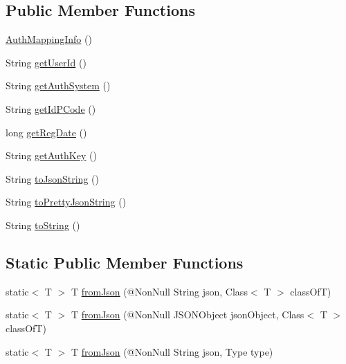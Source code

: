 \subsection*{Public Member Functions}
\begin{DoxyCompactItemize}
\item 
\hyperlink{classcom_1_1toast_1_1android_1_1gamebase_1_1auth_1_1data_1_1_auth_mapping_info_a20f85429edbd833662e307a1f067c519}{Auth\+Mapping\+Info} ()
\item 
String \hyperlink{classcom_1_1toast_1_1android_1_1gamebase_1_1auth_1_1data_1_1_auth_mapping_info_a1a86b0102452494152fce9535952e4f4}{get\+User\+Id} ()
\item 
String \hyperlink{classcom_1_1toast_1_1android_1_1gamebase_1_1auth_1_1data_1_1_auth_mapping_info_af87585b56b9b199257abe7dc8cd9f8a5}{get\+Auth\+System} ()
\item 
String \hyperlink{classcom_1_1toast_1_1android_1_1gamebase_1_1auth_1_1data_1_1_auth_mapping_info_a395665057f556d75356579ff853fbc0e}{get\+Id\+P\+Code} ()
\item 
long \hyperlink{classcom_1_1toast_1_1android_1_1gamebase_1_1auth_1_1data_1_1_auth_mapping_info_a9532e1636d0dfc2bee56231288f3eb43}{get\+Reg\+Date} ()
\item 
String \hyperlink{classcom_1_1toast_1_1android_1_1gamebase_1_1auth_1_1data_1_1_auth_mapping_info_a28802b35bac567661371ca782598bf82}{get\+Auth\+Key} ()
\item 
String \hyperlink{classcom_1_1toast_1_1android_1_1gamebase_1_1base_1_1_value_object_a58acf6402880e9769d79d8667581fa6a}{to\+Json\+String} ()
\item 
String \hyperlink{classcom_1_1toast_1_1android_1_1gamebase_1_1base_1_1_value_object_a054431f3d988a22295cfc8b784ff2637}{to\+Pretty\+Json\+String} ()
\item 
String \hyperlink{classcom_1_1toast_1_1android_1_1gamebase_1_1base_1_1_value_object_ad146fa8579a5f8a876c4688cc5a68520}{to\+String} ()
\end{DoxyCompactItemize}
\subsection*{Static Public Member Functions}
\begin{DoxyCompactItemize}
\item 
static$<$ T $>$ T \hyperlink{classcom_1_1toast_1_1android_1_1gamebase_1_1base_1_1_value_object_ae6655c88c20a9a8406dc11b46250ac7b}{from\+Json} (@Non\+Null String json, Class$<$ T $>$ class\+OfT)
\item 
static$<$ T $>$ T \hyperlink{classcom_1_1toast_1_1android_1_1gamebase_1_1base_1_1_value_object_ab83c4196ee2e3f11553bbe0f04dc2101}{from\+Json} (@Non\+Null J\+S\+O\+N\+Object json\+Object, Class$<$ T $>$ class\+OfT)
\item 
static$<$ T $>$ T \hyperlink{classcom_1_1toast_1_1android_1_1gamebase_1_1base_1_1_value_object_aa901d97d495150b54bcb80c05672f58a}{from\+Json} (@Non\+Null String json, Type type)
\end{DoxyCompactItemize}



